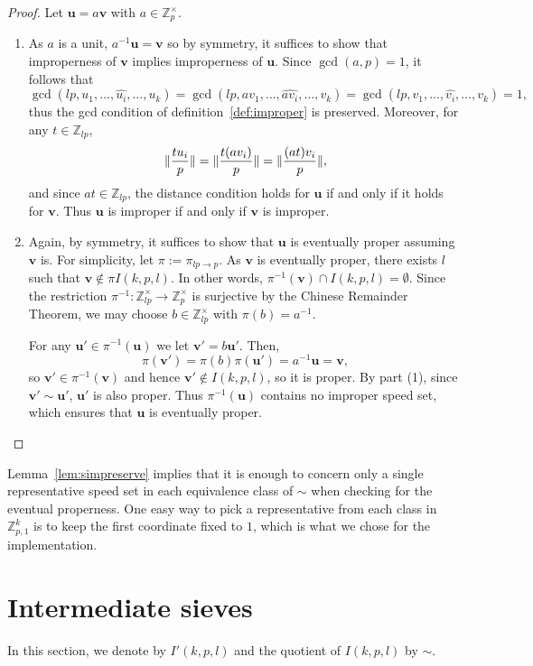\documentclass[11pt]{amsart}
\DeclarePairedDelimiter\norm{\lVert}{\rVert}
\newcommand{\Int}[1]{\mathbb Z_{#1}}
\newcommand{\Unit}[1]{\Int{#1}^\times}
\newcommand{\vbf}{\mathbf{v}}
\newcommand{\ubf}{\mathbf{u}}
\theoremstyle{definition}
\theoremstyle{remark}
\begin{document}
\begin{proof}
  Let $\ubf = a\vbf$ with $a \in \Unit{p}$.
\begin{enumerate}
  \item As $a$ is a unit, $a^{-1} \ubf = \vbf$ so 
  by symmetry, it suffices to show that improperness of $\vbf$ implies improperness of $\ubf$.
  Since $\gcd(a,p)=1$, it follows that  
  \[\gcd(lp, u_1, \dots, \widehat{u_i}, \dots, u_k) = \gcd(lp,av_1,\ldots,\widehat{av_{i}},\ldots,v_k) = \gcd(lp, v_1, \dots, \widehat{v_i}, \dots, v_k) = 1,\]
  thus the gcd condition of definition~\ref{def:improper} is preserved.
  Moreover, for any $t \in \Int{lp}$,
  \[ \norm{\frac{t u_i}{p}} = \norm{\frac{t(av_i)}{p}} = \norm{\frac{(at)v_i}{p}}, \]
  and since $at \in \Int{lp}$, the distance condition holds for $\ubf$ if and only if it holds for $\vbf$.
  Thus $\ubf$ is improper if and only if $\vbf$ is improper.

  \item Again, by symmetry, it suffices to show that $\ubf$ is eventually proper assuming $\vbf$ is.
  For simplicity, let $\pi := \pi_{lp\to p}$.
  As $\vbf$ is eventually proper, there exists $l$ such that $\vbf \not\in \pi I(k, p, l)$.
  In other words, $\pi^{-1}(\vbf) \cap I(k, p, l) = \emptyset$.
  Since the restriction $\pi^{-1} : \Unit{lp} \to \Unit{p}$ is surjective by the Chinese Remainder Theorem, 
  we may choose $b \in \Unit{lp}$ with $\pi(b) = a^{-1}$.

  For any $\ubf' \in \pi^{-1}(\ubf)$ we let $\vbf' = b\ubf'$. Then, 
  \[
    \pi(\vbf') = \pi(b)\pi(\ubf') = a^{-1}\ubf = \vbf,
  \]
  so $\vbf' \in \pi^{-1}(\vbf)$ and hence $\vbf' \notin I(k, p, l)$, so it is proper.
  By part (1), since $\vbf' \sim \ubf'$, $\ubf'$ is also proper.
  Thus $\pi^{-1}(\ubf)$ contains no improper speed set, which ensures that $\ubf$ is eventually proper.
\end{enumerate}
\end{proof}

Lemma~\ref{lem:simpreserve} implies that it is enough to concern only a single representative speed set in each equivalence class 
of $\sim$ when checking for the eventual properness. One easy way to pick a representative from each class in $\Int{p,1}^k$ 
is to keep the first coordinate fixed to $1$, which is what we chose for the implementation.

\section{Intermediate sieves} \label{sec:sieves}
In this section, we denote by $I'(k,p,l)$ and the quotient of $I(k, p, l)$ by $\sim$.
\end{document}
